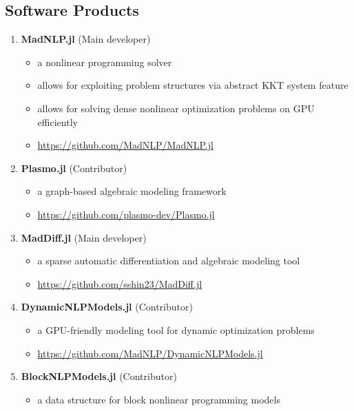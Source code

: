 \documentclass[letterpaper, 11pt]{article}
\begin{document}
\subsection*{Software Products}
\begin{enumerate}[itemsep=0pt]
\renewcommand*{\labelenumi}{[S\theenumi]}
\item {\bf MadNLP.jl} (Main developer)
  \begin{itemize}[leftmargin=*,topsep=0pt,label=$\bullet$,topsep=-5pt,itemsep=-1pt]
  \item a nonlinear programming solver
  \item allows for exploiting problem structures via abstract KKT system feature
  \item allows for solving dense nonlinear optimization problems on GPU efficiently
  \item \url{https://github.com/MadNLP/MadNLP.jl}
\end{itemize}
\item {\bf Plasmo.jl} (Contributor)
  \begin{itemize}[leftmargin=*,topsep=0pt,label=$\bullet$,topsep=-5pt,itemsep=-1pt]
  \item a graph-based algebraic modeling framework
  \item \url{https://github.com/plasmo-dev/Plasmo.jl}
  \end{itemize}
\item {\bf MadDiff.jl} (Main developer)
  \begin{itemize}[leftmargin=*,topsep=0pt,label=$\bullet$,topsep=-5pt,itemsep=-1pt]
  \item a sparse automatic differentiation and algebraic modeling tool
  \item \url{https://github.com/sshin23/MadDiff.jl}
  \end{itemize}
\item {\bf DynamicNLPModels.jl} (Contributor)
  \begin{itemize}[leftmargin=*,topsep=0pt,label=$\bullet$,topsep=-5pt,itemsep=-1pt]
  \item a GPU-friendly modeling tool for dynamic optimization problems
  \item \url{https://github.com/MadNLP/DynamicNLPModels.jl}
  \end{itemize}
\item {\bf BlockNLPModels.jl} (Contributor)
  \begin{itemize}[leftmargin=*,topsep=0pt,label=$\bullet$,topsep=-5pt,itemsep=-1pt]
  \item a data structure for block nonlinear programming models

\end{itemize}
\end{enumerate}
\end{document}
